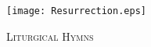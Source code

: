 \fancyhead[RE,LO]{}\fancyhead[RO,LE]{}
\fancyhead[C]{}\thispagestyle{empty}
{}
  \begin{center}
   \texttt{[image: Resurrection.eps]}
   \par
   \vspace{2ex}
   	\textsc{\Huge{Liturgical Hymns}}
   \end{center}